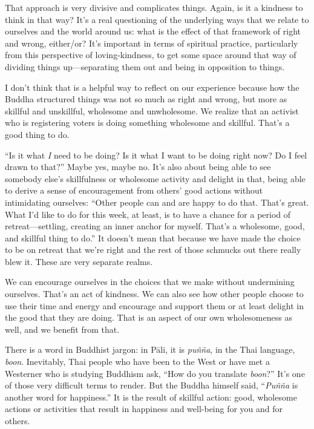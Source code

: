 That approach is very divisive and complicates things. Again, is it a
kindness to think in that way? It’s a real questioning of the underlying
ways that we relate to ourselves and the world around us: what is the
effect of that framework of right and wrong, either/or? It’s important
in terms of spiritual practice, particularly from this perspective of
loving-kindness, to get some space around that way of dividing things
up—separating them out and being in opposition to things.

I don’t think that is a helpful way to reflect on our experience because
how the Buddha structured things was not so much as right and wrong, but
more as skillful and unskillful, wholesome and unwholesome. We realize
that an activist who is registering voters is doing something wholesome
and skillful. That’s a good thing to do.

“Is it what \emph{I} need to be doing? Is it what I want to be doing
right now? Do I feel drawn to that?” Maybe yes, maybe no. It’s also
about being able to see somebody else’s skillfulness or wholesome
activity and delight in that, being able to derive a sense of
encouragement from others’ good actions without intimidating ourselves:
“Other people can and are happy to do that. That’s great. What I’d like
to do for this week, at least, is to have a chance for a period of
retreat—settling, creating an inner anchor for myself. That’s a
wholesome, good, and skillful thing to do.” It doesn’t mean that because
we have made the choice to be on retreat that we’re right and the rest
of those schmucks out there really blew it. These are very separate
realms.

We can encourage ourselves in the choices that we make without
undermining ourselves. That’s an act of kindness. We can also see how
other people choose to use their time and energy and encourage and
support them or at least delight in the good that they are doing. That
is an aspect of our own wholesomeness as well, and we benefit from that.

There is a word in Buddhist jargon: in Pāli, it is \emph{puñña}, in the
Thai language, \emph{boon}. Inevitably, Thai people who have been to the
West or have met a Westerner who is studying Buddhism ask, “How do you
translate \emph{boon}?” It’s one of those very difficult terms to
render. But the Buddha himself said, “\emph{Puñña} is another word for
happiness.” It is the result of skillful action: good, wholesome actions
or activities that result in happiness and well-being for you and for
others.

